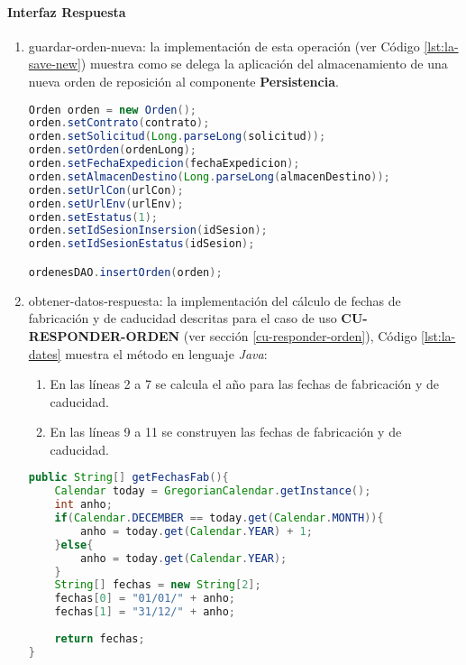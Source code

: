 \paragraph{\indent Interfaz Respuesta}
\begin{enumerate}
	\item guardar-orden-nueva: la implementación de esta operación (ver Código \ref{lst:la-save-new}) muestra como se delega la aplicación del almacenamiento de una nueva orden de reposición al componente \textbf{Persistencia}.
	\begin{lstlisting}[language=Java, caption={Delegación del almacenamiento de una nueva orden de reposición.}, captionpos=b, label={lst:la-save-new}]
Orden orden = new Orden();
orden.setContrato(contrato);
orden.setSolicitud(Long.parseLong(solicitud));
orden.setOrden(ordenLong);
orden.setFechaExpedicion(fechaExpedicion);
orden.setAlmacenDestino(Long.parseLong(almacenDestino));
orden.setUrlCon(urlCon);
orden.setUrlEnv(urlEnv);
orden.setEstatus(1);
orden.setIdSesionInsersion(idSesion);
orden.setIdSesionEstatus(idSesion);

ordenesDAO.insertOrden(orden);
	\end{lstlisting}

	\item obtener-datos-respuesta: la implementación del cálculo de fechas de fabricación y de caducidad descritas para el caso de uso \textbf{CU-RESPONDER-ORDEN} (ver sección \ref{cu-responder-orden}), Código \ref{lst:la-dates} muestra el método en lenguaje \textit{Java}:
	\begin{enumerate}
		\item En las líneas 2 a 7 se calcula el año para las fechas de fabricación y de caducidad.
		\item En las líneas 9 a 11 se construyen las fechas de fabricación y de caducidad.
	\end{enumerate}
	\begin{lstlisting}[language=Java, caption={Método para calcular las fechas de fabricación y caducidad.}, captionpos=b, label={lst:la-dates}]
public String[] getFechasFab(){
	Calendar today = GregorianCalendar.getInstance();
	int anho;
	if(Calendar.DECEMBER == today.get(Calendar.MONTH)){
		anho = today.get(Calendar.YEAR) + 1;
	}else{
		anho = today.get(Calendar.YEAR);
	}
	String[] fechas = new String[2];
	fechas[0] = "01/01/" + anho;
	fechas[1] = "31/12/" + anho;
	
	return fechas;
}
	\end{lstlisting}


\end{enumerate}
